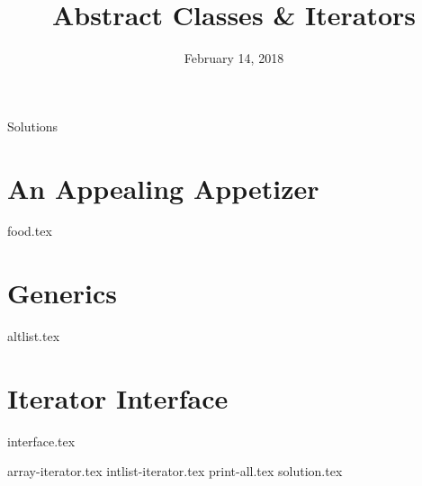 \documentclass[11pt]{exam}
\title{Abstract Classes \& Iterators}
\date{February 14, 2018}
\begin{document}
\maketitle
\begin{solution}\huge{Solutions}\end{solution}

\section{An Appealing Appetizer}
\begin{questions}
{food.tex}
\end{questions}
\clearpage

\section{Generics}
\begin{questions}
{altlist.tex}
\end{questions}
\clearpage

\section{Iterator Interface}
{interface.tex}
\begin{questions}
{array-iterator.tex}
\clearpage
{intlist-iterator.tex}
{print-all.tex}
{solution.tex}
\end{questions}
\end{document}
